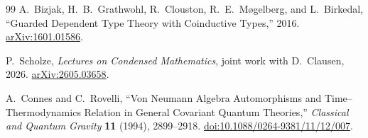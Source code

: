 \documentclass[a4paper,11pt]{ltjsarticle}
\theoremstyle{remark}
\begin{document}
\begin{thebibliography}{99}
A.~Bizjak, H.~B.~Grathwohl, R.~Clouston, R.~E.~M\o gelberg, and L.~Birkedal,
``Guarded Dependent Type Theory with Coinductive Types,''
2016.
\href{https://arxiv.org/abs/1601.01586}{arXiv:1601.01586}.

P.~Scholze,
\textit{Lectures on Condensed Mathematics},
joint work with D.~Clausen, 2026.
\href{https://arxiv.org/abs/2605.03658}{arXiv:2605.03658}.

A.~Connes and C.~Rovelli,
``Von Neumann Algebra Automorphisms and Time--Thermodynamics Relation in General Covariant Quantum Theories,''
\textit{Classical and Quantum Gravity} \textbf{11} (1994), 2899--2918.
\href{https://doi.org/10.1088/0264-9381/11/12/007}{doi:10.1088/0264-9381/11/12/007}.

\end{thebibliography}
\end{document}
